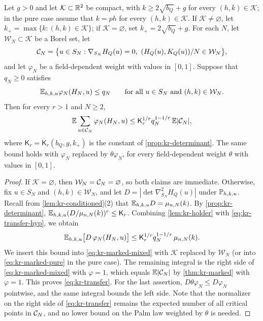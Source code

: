 \begin{theorem}\label{thm:kr-transfer}
Let $g>0$ and let $\mathcal K\subset\mathbb R^2$ be compact, with $k\ge2\sqrt{b_Q}+g$ for every $(h,k)\in\mathcal K$; in the pure case assume that $k=ph$ for every $(h,k)\in\mathcal K$. If $\mathcal K\ne\varnothing$, let $k_+=\max\{k:(h,k)\in\mathcal K\}$; if $\mathcal K=\varnothing$, set $k_+=2\sqrt{b_Q}+g$. For each $N$, let $\mathcal W_N\subset\mathcal K$ be a Borel set, let
\[
\mathcal C_N=\big\{u\in S_N:\nabla_{S_N}H_Q(u)=0,\ (H_Q(u),K_Q(u))/N\in\mathcal W_N\big\},
\]
and let $\varphi_N$ be a field-dependent weight with values in $[0,1]$. Suppose that $q_N\ge0$ satisfies
\begin{equation}\label{eq:kr-transfer-hyp}
\mathbb E_{h,k,u}\varphi_N(H_N,u)\le q_N\qquad\text{for all }u\in S_N\text{ and }(h,k)\in\mathcal W_N.
\end{equation}
Then for every $r>1$ and $N\ge2$,
\begin{equation}\label{eq:kr-transfer}
\mathbb E\sum_{u\in\mathcal C_N}\varphi_N(H_N,u)\le\mathsf K_r^{1/r}q_N^{1-1/r}\,\mathbb E|\mathcal C_N|,
\end{equation}
where $\mathsf K_r=\mathsf K_r(b_Q,g,k_+)$ is the constant of \cref{prop:kr-determinant}. The same bound holds with $\varphi_N$ replaced by $\theta\varphi_N$, for every field-dependent weight $\theta$ with values in $[0,1]$.
\end{theorem}

\begin{proof}
If $\mathcal K=\varnothing$, then $\mathcal W_N=\mathcal C_N=\varnothing$, so both claims are immediate. Otherwise, fix $u\in S_N$ and $(h,k)\in\mathcal W_N$, and let $D=|\det\nabla^2_{S_N}H_Q(u)|$ under $\mathbb P_{h,k,u}$. Recall from \cref{lem:kr-conditioned}(2) that $\mathbb E_{h,k,u}D=\mu_{n,N}(k)$. By \cref{prop:kr-determinant}, $\mathbb E_{h,k,u}(D/\mu_{n,N}(k))^r\le\mathsf K_r$. Combining \cref{lem:kr-holder} with \eqref{eq:kr-transfer-hyp}, we obtain
\[
\mathbb E_{h,k,u}\big[D\,\varphi_N(H_N,u)\big]\le\mathsf K_r^{1/r}q_N^{1-1/r}\,\mu_{n,N}(k).
\]
We insert this bound into \eqref{eq:kr-marked-mixed} with $\mathcal K$ replaced by $\mathcal W_N$ (or into \eqref{eq:kr-marked-pure} in the pure case). The remaining integral is the right side of \eqref{eq:kr-marked-mixed} with $\varphi=1$, which equals $\mathbb E|\mathcal C_N|$ by \cref{thm:kr-marked} with $\varphi=1$. This proves \eqref{eq:kr-transfer}. For the last assertion, $D\theta\varphi_N\le D\varphi_N$ pointwise, and the same integral bounds the left side. Note that the normalizer on the right side of \eqref{eq:kr-transfer} remains the expected number of all critical points in $\mathcal C_N$, and no lower bound on the Palm law weighted by $\theta$ is needed.
\end{proof}

